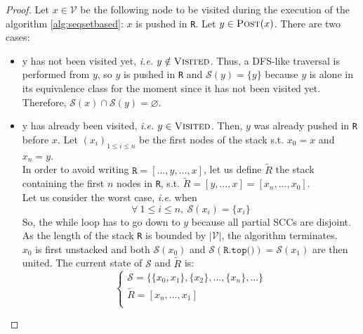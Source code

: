 \documentclass[a4 paper, 12pt]{article}
\theoremstyle{definition}
\begin{document}
\begin{proof}
    Let $x \in \mathcal{V}$ be the following node to be visited during the execution of the algorithm \ref{alg:seqsetbased}: $x$ is pushed in \texttt{R}. Let $y \in \textsc{Post}(x)$. There are two cases:\\
    \begin{itemize}
        \item y has not been visited yet, \textit{i.e.} $y \notin \textsc{Visited}$. Thus, a DFS-like traversal is performed from $y$, so $y$ is pushed in \texttt{R} and $\mathcal{S}(y) = \{y\}$ because $y$ is alone in its equivalence class for the moment since it has not been visited yet.\\
        Therefore, $\mathcal{S}(x) \cap \mathcal{S}(y) = \varnothing$.

        \item y has already been visited, \textit{i.e.} $y \in \textsc{Visited}$. Then, $y$ was already pushed in \texttt{R} before $x$. Let $(x_i)_{1\leq i \leq n}$ be the first nodes of the stack s.t. $x_0 = x$ and $x_n = y$.\\
        In order to avoid writing $\texttt{R} = [\ldots, y, \ldots, x]$, let us define $\widetilde{R}$ the stack containing the first $n$ nodes in \texttt{R}, s.t. $\widetilde{R} = [y, \ldots, x] = [x_n, \ldots, x_0]$.\\
        Let us consider the worst case, \textit{i.e.} when
        \begin{equation*}
            \forall~1 \leq i \leq n,~\mathcal{S}(x_i) = \{x_i\}
        \end{equation*}
        So, the while loop has to go down to $y$ because all partial SCCs are disjoint. As the length of the stack \texttt{R} is bounded by $|\mathcal{V}|$, the algorithm terminates.\\
        $x_0$ is first unstacked and both $\mathcal{S}(x_0)$ and $\mathcal{S}(\texttt{R.top()}) = \mathcal{S}(x_1)$ are then united. The current state of $\mathcal{S}$ and $\widetilde{R}$ is:
        \begin{equation*}
            \left\{
                \begin{array}{l}
                    \mathcal{S} = \{\{x_0, x_1\}, \{x_2\}, \ldots, \{x_n\}, \ldots\}\\
                    \widetilde{R} = [x_n, \ldots, x_1]\\
                \end{array}
            \right.
        \end{equation*}

\end{itemize}
\end{proof}
\end{document}
